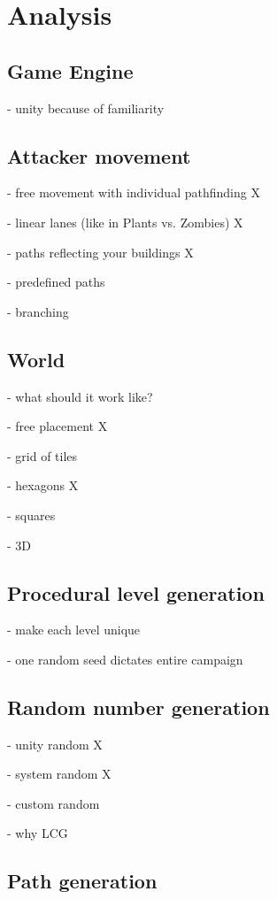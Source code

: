 \chapter{Analysis}

\section{Game Engine}

- unity because of familiarity

\section{Attacker movement}

- free movement with individual pathfinding X

- linear lanes (like in Plants vs. Zombies) X

- paths reflecting your buildings X

- predefined paths \checkmark

- branching

\section{World}

- what should it work like?

- free placement X

- grid of tiles \checkmark

- hexagons X

- squares \checkmark

- 3D \checkmark

\section{Procedural level generation}

- make each level unique

- one random seed dictates entire campaign

\section{Random number generation}

- unity random X

- system random X

- custom random \checkmark

- why LCG

\section{Path generation}

